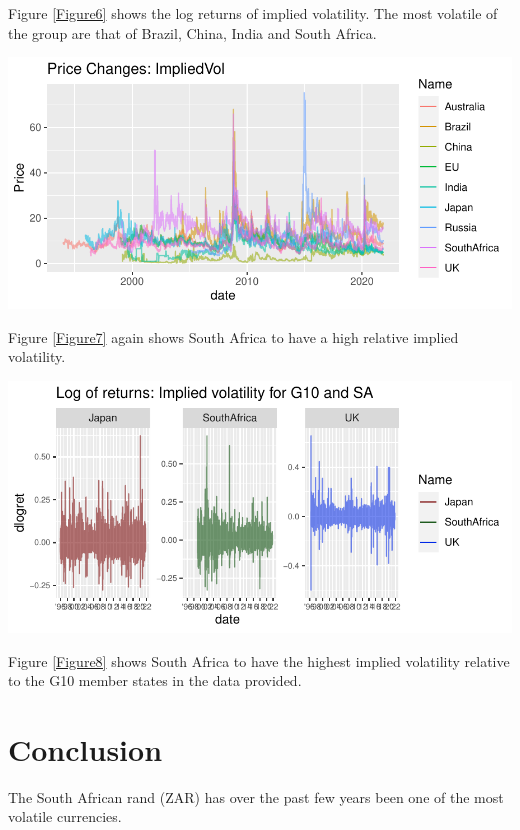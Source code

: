 \documentclass[11pt,preprint, authoryear]{elsarticle}
\let\origfigure\figure
\let\endorigfigure\endfigure
\renewenvironment{figure}[1][2] {
    \expandafter\origfigure\expandafter[H]
} {
    \endorigfigure
}
\numberwithin{equation}{section}
\numberwithin{figure}{section}
\numberwithin{table}{section}
\begin{document}
Figure \ref{Figure6} shows the log returns of implied volatility. The
most volatile of the group are that of Brazil, China, India and South
Africa.

\begin{figure}[H]

{\centering \includegraphics{Question5_files/figure-latex/Figure7-1} 

}

\caption{Caption Here \label{Figure7}}\label{fig:Figure7}
\end{figure}

Figure \ref{Figure7} again shows South Africa to have a high relative
implied volatility.

\begin{figure}[H]

{\centering \includegraphics{Question5_files/figure-latex/Figure8-1} 

}

\caption{Caption Here \label{Figure8}}\label{fig:Figure8}
\end{figure}

Figure \ref{Figure8} shows South Africa to have the highest implied
volatility relative to the G10 member states in the data provided.

\hypertarget{conclusion}{%
\section{\texorpdfstring{Conclusion
\label{Concl}}{Conclusion }}\label{conclusion}}

The South African rand (ZAR) has over the past few years been one of the
most volatile currencies.


\end{document}
